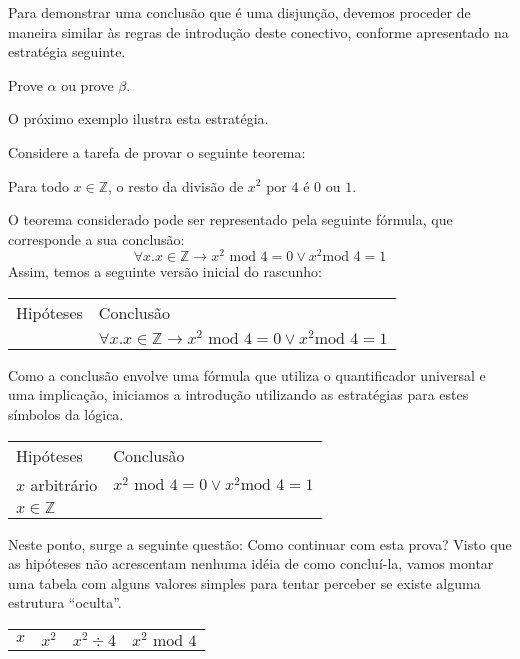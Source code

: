 Para demonstrar uma conclusão que é uma disjunção, devemos proceder de
maneira similar às regras de introdução deste conectivo, conforme
apresentado na estratégia seguinte.

\begin{ProofStrategy}
Prove $\alpha$ ou prove $\beta$.
\end{ProofStrategy}

O próximo exemplo ilustra esta estratégia.

\begin{Example}
Considere a tarefa de provar o seguinte teorema:
\begin{flushleft}
Para todo $x\in\mathbb{Z}$, o resto da divisão de $x^2$ por $4$ é $0$
ou $1$.
\end{flushleft}
O teorema considerado pode ser representado pela seguinte fórmula, que
corresponde a sua conclusão:
\[
\forall x. x \in\mathbb{Z} \to x^2 \text{ mod } 4 = 0 \lor x^2 \text{
  mod } 4 = 1
\]
Assim, temos a seguinte versão inicial do rascunho:
\begin{flushleft}
\begin{tabular}{ll}
Hipóteses & Conclusão \\
  & $\forall x. x \in\mathbb{Z} \to x^2 \text{ mod } 4 = 0 \lor x^2 \text{
  mod } 4 = 1$\\
\end{tabular}
\end{flushleft}
Como a conclusão envolve uma fórmula que utiliza o quantificador
universal e uma implicação, iniciamos a introdução utilizando as
estratégias para estes símbolos da lógica.
\begin{flushleft}
\begin{tabular}{ll}
Hipóteses & Conclusão \\
 $x$ arbitrário & $x^2 \text{ mod } 4 = 0 \lor x^2 \text{
  mod } 4 = 1$\\
$x\in\mathbb{Z}$ & \\
\end{tabular}
\end{flushleft}
Neste ponto, surge a seguinte questão: Como continuar com esta prova?
Visto que as hipóteses não acrescentam nenhuma idéia de como
concluí-la, vamos montar uma tabela com alguns valores simples para
tentar perceber se existe alguma estrutura ``oculta''.
\begin{table}
\begin{tabular}{cccc}
$x$ & $x^2$ & $x^2 \div 4$ & $x^2 \text{ mod } 4$ \\

\end{tabular}
\end{table}
\end{Example}
